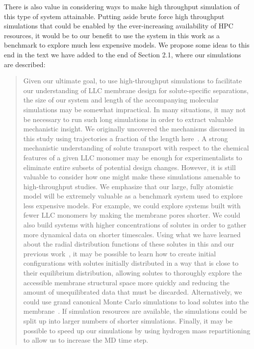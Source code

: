 \documentclass{article}
\begin{document}
\begin{enumerate}[label={Comment \theenumi :}, leftmargin=3.9\parindent]
    There is also value in considering ways to make high throughput simulation of this type of 
    system attainable. Putting aside brute force high throughput simulations that could be enabled 
    by the ever-increasing availability of HPC resources, it would be to our benefit to use the
    system in this work as a benchmark to explore much less expensive models. We propose some ideas
    to this end in the text we have added to the end of Section 2.1, where our simulations are described:
    \begin{quote}
  Given our ultimate goal, to use high-throughput simulations to facilitate our understanding 
  of LLC membrane design for solute-specific separations, the size of our system and length 
  of the accompanying molecular simulations may be somewhat impractical. In many 
  situations, it may not be necessary to run such long simulations in order to extract 
  valuable mechanistic insight. We originally uncovered the mechanisms discussed in this
  study using trajectories a fraction of the length here~\cite{coscia_chemically_2019}. A 
  strong mechanistic understanding of solute transport with respect to the chemical features of a 
  given LLC monomer may be enough for experimentalists to eliminate entire subsets of potential
  design changes. However, it is still valuable to consider how one might make these simulations
  amenable to high-throughput studies. We emphasize that our large, fully atomistic 
  model will be extremely valuable as a benchmark system used to explore less expensive models. 
  For example, we could explore systems built with fewer LLC monomers by making the membrane pores
  shorter. We could also build systems with higher concentrations of solutes in order to gather more 
  dynamical data on shorter timescales. Using what we have learned about the radial distribution
  functions of these solutes in this and our previous work~\cite{coscia_chemically_2019}, it may be possible to 
  learn how to create initial configurations with solutes initially distributed in a way that
  is close to their equilibrium distribution, allowing solutes to thoroughly explore the 
  accessible membrane structural space more quickly and reducing the amount of unequilibrated
  data that must be discarded. Alternatively, we could use grand canonical Monte Carlo simulations
  to load solutes into the membrane~\cite{snurr_prediction_1993}. If simulation resources are
  available, the simulations could be split up into larger numbers of shorter simulations.
  Finally, it may be possible to speed up our simulations by using hydrogen mass 
  repartitioning to allow us to increase the MD time step.~\cite{hopkins_long-time-step_2015}
    \end{quote}
    

\end{enumerate}
\end{document}
